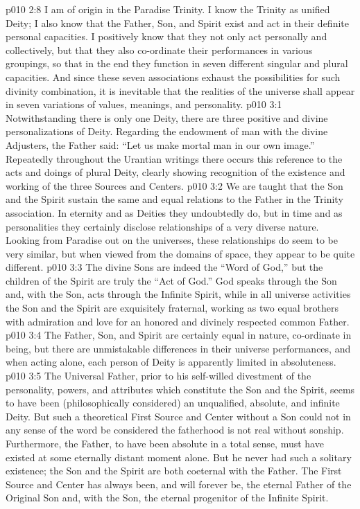 \vs p010 2:8 I am of origin in the Paradise Trinity. I know the Trinity as unified Deity; I also know that the Father, Son, and Spirit exist and act in their definite personal capacities. I positively know that they not only act personally and collectively, but that they also co\hyp{}ordinate their performances in various groupings, so that in the end they function in seven different singular and plural capacities. And since these seven associations exhaust the possibilities for such divinity combination, it is inevitable that the realities of the universe shall appear in seven variations of values, meanings, and personality.
\vs p010 3:1 Notwithstanding there is only one Deity, there are three positive and divine personalizations of Deity. Regarding the endowment of man with the divine Adjusters, the Father said: “Let us make mortal man in our own image.” Repeatedly throughout the Urantian writings there occurs this reference to the acts and doings of plural Deity, clearly showing recognition of the existence and working of the three Sources and Centers.
\pc \vs p010 3:2 We are taught that the Son and the Spirit sustain the same and equal relations to the Father in the Trinity association. In eternity and as Deities they undoubtedly do, but in time and as personalities they certainly disclose relationships of a very diverse nature. Looking from Paradise out on the universes, these relationships do seem to be very similar, but when viewed from the domains of space, they appear to be quite different.
\vs p010 3:3 The divine Sons are indeed the “Word of God,” but the children of the Spirit are truly the “Act of God.” God speaks through the Son and, with the Son, acts through the Infinite Spirit, while in all universe activities the Son and the Spirit are exquisitely fraternal, working as two equal brothers with admiration and love for an honored and divinely respected common Father.
\vs p010 3:4 The Father, Son, and Spirit are certainly equal in nature, co\hyp{}ordinate in being, but there are unmistakable differences in their universe performances, and when acting alone, each person of Deity is apparently limited in absoluteness.
\pc \vs p010 3:5 The Universal Father, prior to his self\hyp{}willed divestment of the personality, powers, and attributes which constitute the Son and the Spirit, seems to have been (philosophically considered) an unqualified, absolute, and infinite Deity. But such a theoretical First Source and Center without a Son could not in any sense of the word be considered the  fatherhood is not real without sonship. Furthermore, the Father, to have been absolute in a total sense, must have existed at some eternally distant moment alone. But he never had such a solitary existence; the Son and the Spirit are both coeternal with the Father. The First Source and Center has always been, and will forever be, the eternal Father of the Original Son and, with the Son, the eternal progenitor of the Infinite Spirit.

